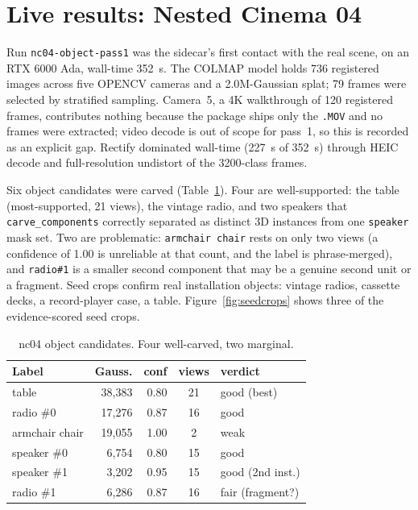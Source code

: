 \section{Live results: Nested Cinema 04}

Run \texttt{nc04-object-pass1} was the sidecar's first contact with the real scene, on an
RTX 6000 Ada, wall-time \SI{352}{\second}. The COLMAP model holds 736 registered images
across five OPENCV cameras and a 2.0M-Gaussian splat; 79 frames were selected by stratified
sampling. Camera~5, a 4K walkthrough of 120 registered frames, contributes nothing because
the package ships only the \texttt{.MOV} and no frames were extracted; video decode is out of
scope for pass~1, so this is recorded as an explicit gap. Rectify dominated wall-time
(\SI{227}{\second} of \SI{352}{\second}) through HEIC decode and full-resolution undistort of the
3200-class frames.

Six object candidates were carved (Table~\ref{tab:nc04}). Four are well-supported: the table
(most-supported, 21 views), the vintage radio, and two speakers that \texttt{carve\_components}
correctly separated as distinct 3D instances from one \texttt{speaker} mask set. Two are
problematic: \texttt{armchair chair} rests on only two views (a confidence of 1.00 is unreliable
at that count, and the label is phrase-merged), and \texttt{radio\#1} is a smaller second component
that may be a genuine second unit or a fragment. Seed crops confirm real installation objects: vintage
radios, cassette decks, a record-player case, a table. Figure~\ref{fig:seedcrops} shows
three of the evidence-scored seed crops.

\begin{table}[t]
\centering\small
\caption{nc04 object candidates. Four well-carved, two marginal.
}
\label{tab:nc04}
\setlength{\tabcolsep}{4pt}
\begin{tabular}{@{}lrrcl@{}}
\toprule
Label & Gauss. & conf & views & verdict \\
\midrule
table          & 38{,}383 & 0.80 & 21 & good (best) \\
radio \#0      & 17{,}276 & 0.87 & 16 & good \\
armchair chair & 19{,}055 & 1.00 & 2  & weak \\
speaker \#0    & 6{,}754  & 0.80 & 15 & good \\
speaker \#1    & 3{,}202  & 0.95 & 15 & good (2nd inst.) \\
radio \#1      & 6{,}286  & 0.87 & 16 & fair (fragment?) \\
\bottomrule
\end{tabular}
\end{table}

